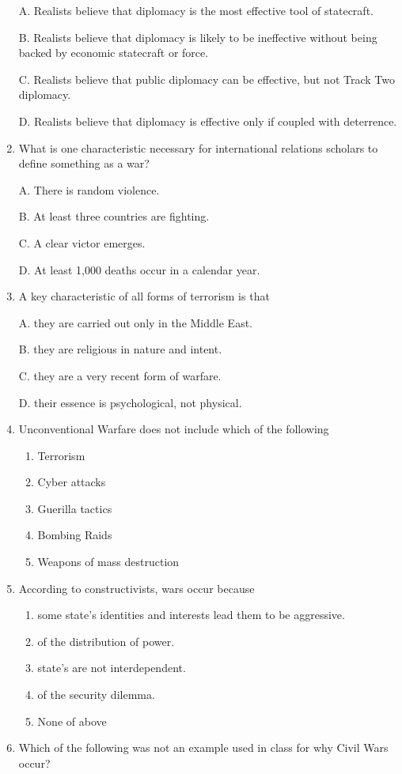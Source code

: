 \documentclass[
]{book}
\begin{document}
\begin{enumerate}
  A. Realists believe that diplomacy is the most effective tool of statecraft.

  B. Realists believe that diplomacy is likely to be ineffective without being backed by economic statecraft or force.

  C. Realists believe that public diplomacy can be effective, but not Track Two diplomacy.

  D. Realists believe that diplomacy is effective only if coupled with deterrence.
\item
  What is one characteristic necessary for international relations scholars to define something as a war?

  A. There is random violence.

  B. At least three countries are fighting.

  C. A clear victor emerges.

  D. At least 1,000 deaths occur in a calendar year.
\item
  A key characteristic of all forms of terrorism is that

  A. they are carried out only in the Middle East.

  B. they are religious in nature and intent.

  C. they are a very recent form of warfare.

  D. their essence is psychological, not physical.
\item
  Unconventional Warfare does not include which of the following

  \begin{enumerate}
  \def\labelenumii{\Alph{enumii}.}
  \item
    Terrorism
  \item
    Cyber attacks
  \item
    Guerilla tactics
  \item
    Bombing Raids
  \item
    Weapons of mass destruction
  \end{enumerate}
\item
  According to constructivists, wars occur because

  \begin{enumerate}
  \def\labelenumii{\Alph{enumii}.}
  \item
    some state's identities and interests lead them to be aggressive.
  \item
    of the distribution of power.
  \item
    state's are not interdependent.
  \item
    of the security dilemma.
  \item
    None of above
  \end{enumerate}
\item
  Which of the following was not an example used in class for why Civil Wars occur?


\end{enumerate}
\end{document}
